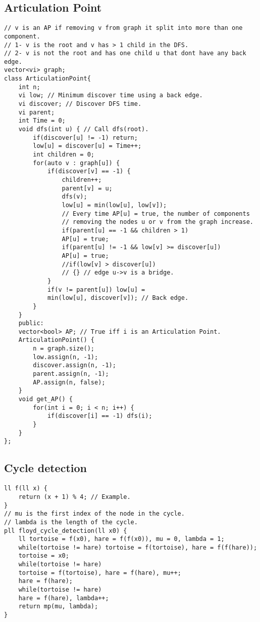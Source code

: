 \documentclass[a4paper]{article}
\begin{document}
\subsection*{Articulation Point}
\begin{multicols}{2}
\begin{verbatim}
// v is an AP if removing v from graph it split into more than one component.
// 1- v is the root and v has > 1 child in the DFS.
// 2- v is not the root and has one child u that dont have any back edge.
vector<vi> graph;
class ArticulationPoint{
    int n;
    vi low; // Minimum discover time using a back edge.
    vi discover; // Discover DFS time.
    vi parent;
    int Time = 0;
    void dfs(int u) { // Call dfs(root).
        if(discover[u] != -1) return;
        low[u] = discover[u] = Time++;
        int children = 0;
        for(auto v : graph[u]) {
            if(discover[v] == -1) {
                children++;
                parent[v] = u;
                dfs(v);
                low[u] = min(low[u], low[v]);
                // Every time AP[u] = true, the number of components
                // removing the nodes u or v from the graph increase.
                if(parent[u] == -1 && children > 1) 
                AP[u] = true;
                if(parent[u] != -1 && low[v] >= discover[u]) 
                AP[u] = true;
                //if(low[v] > discover[u])
                // {} // edge u->v is a bridge.
            }
            if(v != parent[u]) low[u] = 
            min(low[u], discover[v]); // Back edge.
        }
    }
    public:
    vector<bool> AP; // True iff i is an Articulation Point.
    ArticulationPoint() {
        n = graph.size();
        low.assign(n, -1);
        discover.assign(n, -1);
        parent.assign(n, -1);
        AP.assign(n, false);
    }
    void get_AP() {
        for(int i = 0; i < n; i++) {
            if(discover[i] == -1) dfs(i);
        }
    }
};
\end{verbatim}
\end{multicols}
\subsection*{Cycle detection}
\begin{multicols}{2}
\begin{verbatim}
ll f(ll x) {
    return (x + 1) % 4; // Example.
}
// mu is the first index of the node in the cycle.
// lambda is the length of the cycle.
pll floyd_cycle_detection(ll x0) {
    ll tortoise = f(x0), hare = f(f(x0)), mu = 0, lambda = 1;
    while(tortoise != hare) tortoise = f(tortoise), hare = f(f(hare));
    tortoise = x0;
    while(tortoise != hare) 
    tortoise = f(tortoise), hare = f(hare), mu++;
    hare = f(hare);
    while(tortoise != hare)
    hare = f(hare), lambda++;
    return mp(mu, lambda);
}
\end{verbatim}
\end{multicols}
\end{document}
